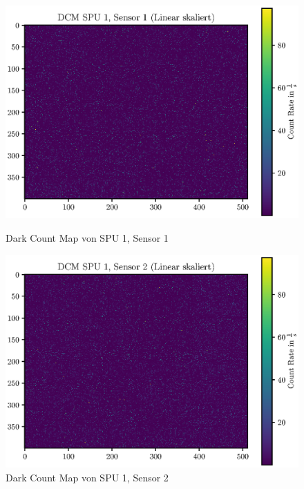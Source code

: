 \documentclass[12pt,twoside,a4paper]{scrartcl}
\begin{document}
			\begin{figure}[H]
				\begin{minipage}{0.49 \textwidth}
					\includegraphics[width = \textwidth]{Plots/DCM/DCM_SPU1_Sensor1_lin.eps}
					\caption{Dark Count Map von SPU 1, Sensor 1}
				\end{minipage}
				\begin{minipage}{0.49 \textwidth}
					\includegraphics[width = \textwidth]{Plots/DCM/DCM_SPU1_Sensor2_lin.eps}
					\caption{Dark Count Map von SPU 1, Sensor 2}
				\end{minipage}
			\end{figure}
\end{document}
